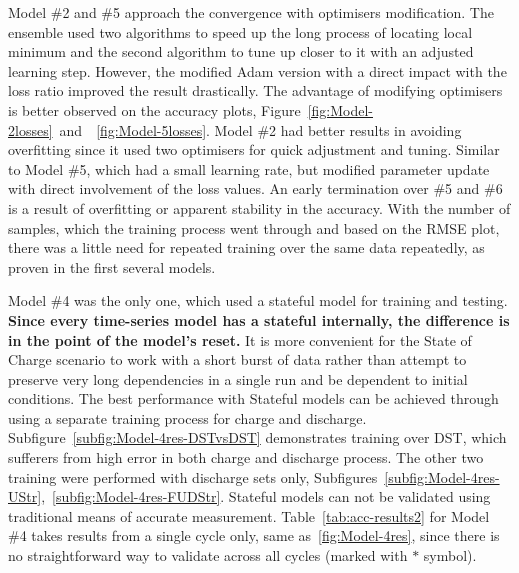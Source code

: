 %
%
Model \#2 and \#5 approach the convergence with optimisers modification.
The ensemble used two algorithms to speed up the long process of locating local minimum and the second algorithm to tune up closer to it with an adjusted learning step.
However, the modified Adam version with a direct impact with the loss ratio improved the result drastically.
The advantage of modifying optimisers is better observed on the accuracy plots, \mbox{Figure~\ref{fig:Model-2losses} and ~\ref{fig:Model-5losses}}.
Model \#2 had better results in avoiding overfitting since it used two optimisers for quick adjustment and tuning.
Similar to Model \#5, which had a small learning rate, but modified parameter update with direct involvement of the loss values.
An early termination over \#5 and \#6 is a result of overfitting or apparent stability in the accuracy.
With the number of samples, which the training process went through and based on the RMSE plot, there was a little need for repeated training over the same data repeatedly, as proven in the first several models.

%
Model \#4 was the only one, which used a stateful model for training and testing.
\textbf{Since every time-series model has a stateful internally, the difference is in the point of the model's reset.}
It is more convenient for the State of Charge scenario to work with a short burst of data rather than attempt to preserve very long dependencies in a single run and be dependent to initial conditions.
%
%
The best performance with Stateful models can be achieved through using a separate training process for charge and discharge. 
\mbox{Subfigure~\ref{subfig:Model-4res-DSTvsDST}} demonstrates training over DST, which sufferers from high error in both charge and discharge process.
The other two training were performed with discharge sets only, \mbox{Subfigures~\ref{subfig:Model-4res-UStr}, \ref{subfig:Model-4res-FUDStr}}.
Stateful models can not be validated using traditional means of accurate measurement.
\mbox{Table~\ref{tab:acc-results2}} for Model \#4 takes results from a single cycle only, same as~\ref{fig:Model-4res}, since there is no straightforward way to validate across all cycles (marked with $*$ symbol).


